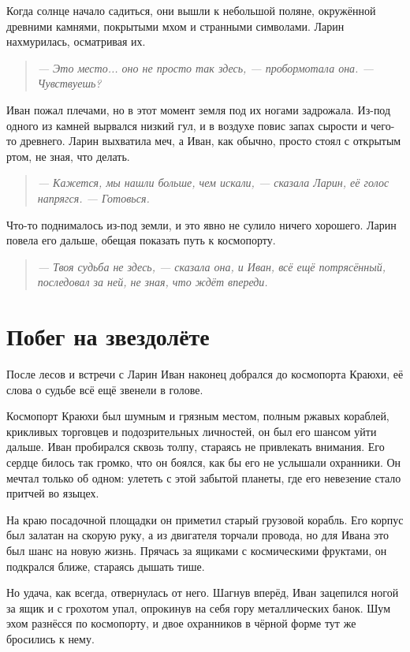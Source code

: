\documentclass[12pt,a4paper]{book}
\newenvironment{dialogue}{\begin{quote}\itshape}{\end{quote}} %
\begin{document}
Когда солнце начало садиться, они вышли к небольшой поляне, окружённой древними камнями, покрытыми мхом и странными символами. Ларин нахмурилась, осматривая их.

\begin{dialogue}
--- Это место... оно не просто так здесь, --- пробормотала она. --- Чувствуешь?
\end{dialogue}

Иван пожал плечами, но в этот момент земля под их ногами задрожала. Из-под одного из камней вырвался низкий гул, и в воздухе повис запах сырости и чего-то древнего. Ларин выхватила меч, а Иван, как обычно, просто стоял с открытым ртом, не зная, что делать.

\begin{dialogue}
--- Кажется, мы нашли больше, чем искали, --- сказала Ларин, её голос напрягся. --- Готовься.
\end{dialogue}

Что-то поднималось из-под земли, и это явно не сулило ничего хорошего. Ларин повела его дальше, обещая показать путь к космопорту.

\begin{dialogue}
--- Твоя судьба не здесь, --- сказала она, и Иван, всё ещё потрясённый, последовал за ней, не зная, что ждёт впереди.
\end{dialogue}

\chapter{Побег на звездолёте}

После лесов и встречи с Ларин Иван наконец добрался до космопорта Краюхи, её слова о судьбе всё ещё звенели в голове.

Космопорт Краюхи был шумным и грязным местом, полным ржавых кораблей, крикливых торговцев и подозрительных личностей, он был его шансом уйти дальше. Иван пробирался сквозь толпу, стараясь не привлекать внимания. Его сердце билось так громко, что он боялся, как бы его не услышали охранники. Он мечтал только об одном: улететь с этой забытой планеты, где его невезение стало притчей во языцех.

На краю посадочной площадки он приметил старый грузовой корабль. Его корпус был залатан на скорую руку, а из двигателя торчали провода, но для Ивана это был шанс на новую жизнь. Прячась за ящиками с космическими фруктами, он подкрался ближе, стараясь дышать тише.

Но удача, как всегда, отвернулась от него. Шагнув вперёд, Иван зацепился ногой за ящик и с грохотом упал, опрокинув на себя гору металлических банок. Шум эхом разнёсся по космопорту, и двое охранников в чёрной форме тут же бросились к нему.
\end{document}
